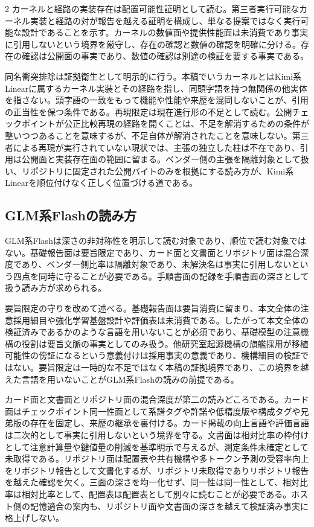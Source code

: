 \documentclass[lualatex,a4paper,10pt]{jlreq}
\begin{document}
\begin{multicols}{2}
カーネルと経路の実装存在は配置可能性証明として読む。第三者実行可能なカーネル実装と経路の対が報告を越える証明を構成し、単なる提案ではなく実行可能な設計であることを示す\autocite{kda}\autocite{kimigithub}。カーネルの数値面や提供性能面は未消費であり事実に引用しないという境界を厳守し、存在の確認と数値の確認を明確に分ける\autocite{kda}。存在の確認は公開面の事実であり、数値の確認は別途の検証を要する事実である。

同名衝突排除は証拠衛生として明示的に行う。本稿でいうカーネルとはKimi系Linearに属するカーネル実装とその経路を指し、同頭字語を持つ無関係の他実体を指さない\autocite{kda}\autocite{kimigithub}。頭字語の一致をもって機能や性能や来歴を混同しないことが、引用の正当性を保つ条件である。再現限定は現在進行形の不足として読む。公開チェックポイントが公正比較再現の経路を開くことは、不足を解消するための条件が整いつつあることを意味するが、不足自体が解消されたことを意味しない\autocite{kimigithub}。第三者による再現が実行されていない現状では、主張の独立した柱は不在であり、引用は公開面と実装存在面の範囲に留まる\autocite{kimigithub}\autocite{kda}。ベンダー側の主張を隔離対象として扱い、リポジトリに固定された公開バイトのみを根拠にする読み方が、Kimi系Linearを順位付けなく正しく位置づける道である。

\subsection{GLM系Flashの読み方}
GLM系Flashは深さの非対称性を明示して読む対象であり、順位で読む対象ではない。基礎報告面は要旨限定であり、カード面と文書面とリポジトリ面は混合深度であり、ベンダー側比率は隔離対象であり、未解決名は事実に引用しないという四点を同時に守ることが必要である\autocite{glm5report}\autocite{glm53card}\autocite{zaidocs}\autocite{glm5github}。手順書面の記録を手順書面の深さとして扱う読み方が求められる。

要旨限定の守りを改めて述べる。基礎報告面は要旨消費に留まり、本文全体の注意採用細目や強化学習基盤設計や評価表は未消費である\autocite{glm5report}。したがって本文全体の検証済みであるかのような言語を用いないことが必須であり、基礎模型の注意機構の役割は要旨文脈の事実としてのみ扱う\autocite{glm5report}。他研究室起源機構の旗艦採用が移植可能性の傍証になるという意義付けは採用事実の意義であり、機構細目の検証ではない。要旨限定は一時的な不足ではなく本稿の証拠境界であり、この境界を越えた言語を用いないことがGLM系Flashの読みの前提である。

カード面と文書面とリポジトリ面の混合深度が第二の読みどころである。カード面はチェックポイント同一性面として系譜タグや許諾や低精度版や構成タグや兄弟版の存在を固定し、来歴の継承を裏付ける\autocite{glm53card}。カード掲載の向上言語や評価言語は二次的として事実に引用しないという境界を守る\autocite{glm53card}。文書面は相対比率の枠付けとして注意計算量や鍵値量の削減を基準明示で与えるが、測定条件未確定として未取得である\autocite{zaidocs}。リポジトリ面は配置表や共有機構や多トークン予測の受容率向上をリポジトリ報告として文書化するが、リポジトリ未取得でありリポジトリ報告を越えた確認を欠く\autocite{glm5github}。三面の深さを均一化せず、同一性は同一性として、相対比率は相対比率として、配置表は配置表として別々に読むことが必要である。ホスト側の記憶適合の案内も、リポジトリ面や文書面の深さを越えて検証済み事実に格上げしない\autocite{unslothglm}\autocite{glm5github}。


\end{multicols}
\end{document}
